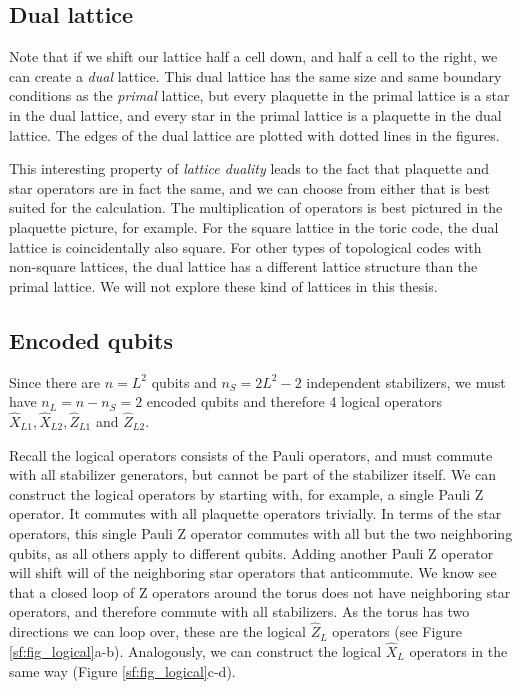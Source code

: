 \subsection{Dual lattice}
Note that if we shift our lattice half a cell down, and half a cell to the right, we can create a \emph{dual} lattice. This dual lattice has the same size and same boundary conditions as the \emph{primal} lattice, but every plaquette in the primal lattice is a star in the dual lattice, and every star in the primal lattice is a plaquette in the dual lattice. The edges of the dual lattice are plotted with dotted lines in the figures.

This interesting property of \emph{lattice duality} leads to the fact that plaquette and star operators are in fact the same, and we can choose from either that is best suited for the calculation. The multiplication of operators is best pictured in the plaquette picture, for example. For the square lattice in the toric code, the dual lattice is coincidentally also square. For other types of topological codes with non-square lattices, the dual lattice has a different lattice structure than the primal lattice. We will not explore these kind of lattices in this thesis.

\subsection{Encoded qubits}
Since there are $n = L^2$ qubits and $n_S = 2L^2 - 2$ independent stabilizers, we must have $n_L = n - n_S = 2$ encoded qubits and therefore 4 logical operators $\hat{X}_{L1}, \hat{X}_{L2}, \hat{Z}_{L1}$ and $\hat{Z}_{L2}$.

Recall the logical operators consists of the Pauli operators, and must commute with all stabilizer generators, but cannot be part of the stabilizer itself. We can construct the logical operators by starting with, for example, a single Pauli Z operator. It commutes with all plaquette operators trivially. In terms of the star operators, this single Pauli Z operator commutes with all but the two neighboring qubits, as all others apply to different qubits. Adding another Pauli Z operator will shift will of the neighboring star operators that anticommute. We know see that a closed loop of Z operators around the torus does not have neighboring star operators, and therefore commute with all stabilizers. As the torus has two directions we can loop over, these are the logical $\hat{Z}_L$ operators (see Figure \ref{sf:fig_logical}a-b). Analogously, we can construct the logical $\hat{X}_L$ operators in the same way (Figure \ref{sf:fig_logical}c-d).

